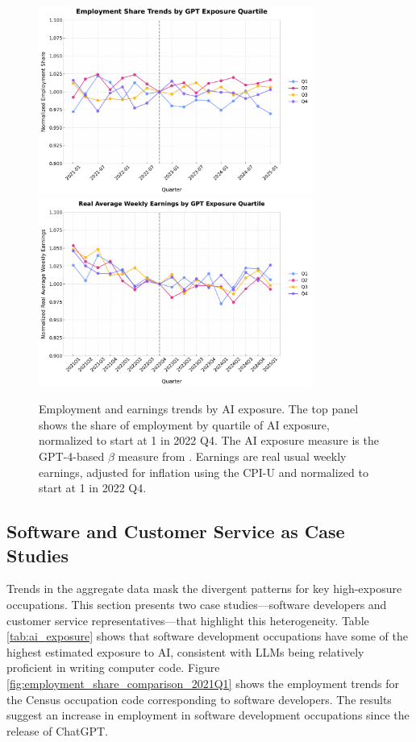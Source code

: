 \documentclass[12pt]{article}
\numberwithin{equation}{section}
\theoremstyle{theorem}\newcustomtheorem{theorem}{{\bf\sc Theorem}}
\theoremstyle{definition}\newcustomtheorem{assumption}{{\bf\sc Assumption}}
\theoremstyle{theorem} \newcustomtheorem{proposition}{{\bf\sc Proposition}}
\begin{document}
\begin{figure}[htbp]
	\centering
  \includegraphics[width=0.8\textwidth]{../figures/employment_share_by_gpt4_beta_quartile_2021q1.pdf}
  \includegraphics[width=0.8\textwidth]{../figures/real_earnings_by_gpt4_beta_quartile_2021q1.pdf}
	\caption{Employment and earnings trends by AI exposure. The top panel shows the share of employment by quartile of AI exposure, normalized to start at 1 in 2022 Q4. The AI exposure measure is the GPT-4-based $\beta$ measure from \citet{eloundou_gpts_2024}. Earnings are real usual weekly earnings, adjusted for inflation using the CPI-U and normalized to start at 1 in 2022 Q4.}
	\label{fig:employment_trends}
\end{figure}




\subsection{Software and Customer Service as Case Studies} 

Trends in the aggregate data mask the divergent patterns for key high-exposure occupations. This section presents two case studies—software developers and customer service representatives—that highlight this heterogeneity. Table \ref{tab:ai_exposure} shows that software development occupations have some of the highest estimated exposure to AI, consistent with LLMs being relatively proficient in writing computer code. Figure \ref{fig:employment_share_comparison_2021Q1} shows the employment trends for the Census occupation code corresponding to software developers. The results suggest an increase in employment in software development occupations since the release of ChatGPT. 
\end{document}
